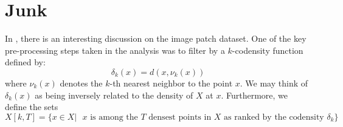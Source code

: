 \documentclass[10pt]{amsart}
\begin{document}
\section{Junk}


In \cite{Carlsson_09}, there is an interesting discussion on the image patch dataset. One of the key pre-processing steps taken in the analysis was to filter by a $k$-codensity function defined by:
$$\delta_k(x) = d(x, \nu_k(x))$$
where $\nu_k(x)$ denotes the $k$-th nearest neighbor to the point $x$. We may think of $\delta_k(x)$ as being inversely related to the density of $X$ at $x$. Furthermore, we define the sets
$$X[k, T] = \{x \in X | \mbox{ $x$ is among the $T$ densest points in $X$ as ranked by the codensity $\delta_k$}\}$$







\end{document}
